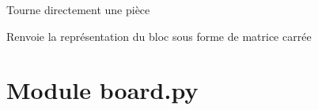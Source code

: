 \documentclass[letterpaper,10pt,french]{sphinxmanual}
\begin{document}
\begin{fulllineitems}

\begin{fulllineitems}
\label{\detokenize{index:tetramino.Tetramino.setRotation}}
Tourne directement une pièce

\end{fulllineitems}


\begin{fulllineitems}
\label{\detokenize{index:tetramino.Tetramino.toArray}}
Renvoie la représentation du bloc sous forme de matrice carrée

\end{fulllineitems}


\end{fulllineitems}



\section{Module board.py}
\label{\detokenize{index:module-board}}\label{\detokenize{index:module-board-py}}
\end{document}
